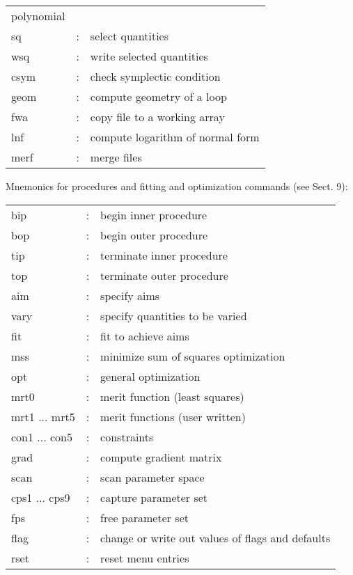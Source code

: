 \begin{table}
\begin{center}
\begin{tabular}{lll}
polynomial\\ sq &: & select quantities\\ wsq &: & write selected
quantities\\ csym &: & check symplectic condition\\ geom &: & compute
geometry of a loop\\ fwa &: & copy file to a working array\\ lnf &: &
compute logarithm of normal form\\ merf &: & merge files \end{tabular}
\end{center} \end{table}

\begin{table}
\indent Mnemonics for procedures and fitting and optimization commands (see
Sect. 9):

\begin{center}
\begin{tabular}{lll} bip &: & begin inner procedure\\ bop &: & begin outer
procedure\\ tip &: & terminate inner procedure\\ top &: & terminate outer
procedure\\ aim &: & specify aims\\ vary &: & specify quantities to be
varied\\ fit &: & fit to achieve aims\\ mss &: & minimize sum of squares
optimization\\ opt &: & general optimization\\ mrt0 &: & merit function
(least squares)\\ mrt1 ... mrt5 &: & merit functions (user written)\\ con1
... con5 &: & constraints\\ grad &: & compute gradient matrix\\ scan &: &
scan parameter space\\ cps1 ... cps9 &: & capture parameter set\\ fps &: &
free parameter set\\ flag &: & change or write out values of flags and
defaults\\rset &: & reset menu entries
\end{tabular}
\end{center}
\end{table}
\clearpage

